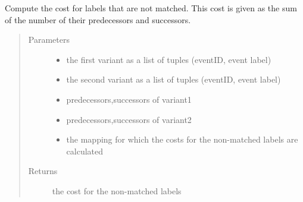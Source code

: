 \documentclass[letterpaper,10pt,english]{sphinxmanual}
\begin{document}

\begin{fulllineitems}
\label{\detokenize{cost function:costFunction.cost.costNoMatch}}
Compute the cost for labels that are not matched. This cost is given as the sum of the number of their predecessors and successors.
\begin{quote}\begin{description}
\item[{Parameters}] \leavevmode\begin{itemize}
\item {} 
 \textendash{} the first variant as a list of tuples (eventID, event label)

\item {} 
 \textendash{} the second variant as a list of tuples (eventID, event label)

\item {} 
 \textendash{} predecessors,successors of variant1

\item {} 
 \textendash{} predecessors,successors of variant2

\item {} 
 \textendash{} the mapping for which the costs for the non-matched labels are calculated

\end{itemize}

\item[{Returns}] \leavevmode
the cost for the non-matched labels

\end{description}\end{quote}

\end{fulllineitems}

\end{document}
